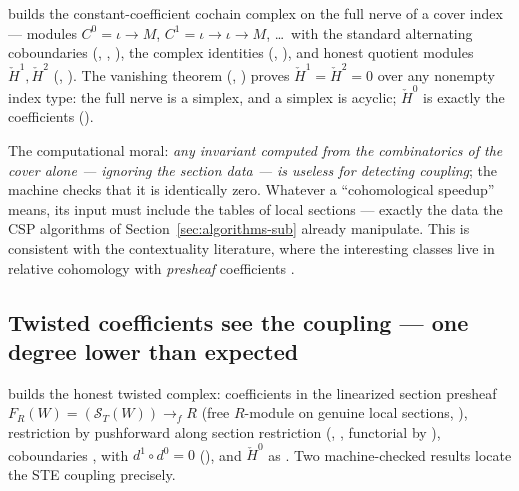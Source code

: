 \documentclass[11pt]{article}
\newcommand{\Sec}{\mathcal S}
\newcommand{\Hech}{\check H}
\begin{document}
 builds the constant-coefficient cochain
complex on the full nerve of a cover index --- modules $C^0 = \iota
\to M$, $C^1 = \iota \to \iota \to M$, \dots\ with the standard
alternating coboundaries (, ,
), the complex identities (,
), and honest quotient modules
$\Hech^1, \Hech^2$ (, ).  The vanishing
theorem (, )
proves $\Hech^1 = \Hech^2 = 0$ over any nonempty index type: the
full nerve is a simplex, and a simplex is acyclic; $\Hech^0$ is
exactly the coefficients ().

The computational moral: \emph{any invariant computed from the
combinatorics of the cover alone --- ignoring the section data ---
is useless for detecting coupling}; the machine checks that it is
identically zero.  Whatever a ``cohomological speedup'' means, its
input must include the tables of local sections --- exactly the data
the CSP algorithms of Section~\ref{sec:algorithms-sub} already
manipulate.  This is consistent with the contextuality literature,
where the interesting classes live in relative cohomology with
\emph{presheaf} coefficients
\citep{abramsky2012cohomology,caru2017cohomology}.

\subsection{Twisted coefficients see the coupling --- one degree
lower than expected}
\label{app:twisted}

 builds the honest twisted complex:
coefficients in the linearized section presheaf $F_R(W) =
(\Sec_T(W)) \to_{\!f} R$ (free $R$-module on genuine local sections,
), restriction by pushforward along section
restriction (, , functorial by
), coboundaries ,
 with $d^1 \circ d^0 = 0$
(), and $\Hech^0$ as .  Two
machine-checked results locate the STE coupling precisely.
\end{document}
